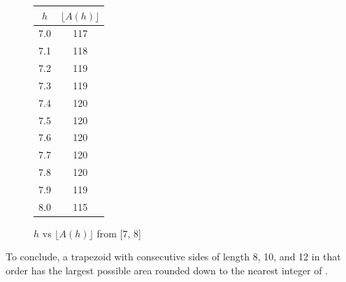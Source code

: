 \begin{solution}
\begin{figure}[h]
    \centering
    \begin{minipage}[h]{0.48\textwidth}
        \vspace{0pt}
        \caption{Graph of both normal and floor functions. \\ $A(h) = \frac{10+\left(\sqrt{64-h^{2}}+10+\sqrt{144-h^{2}}\right)}{2}h, \quad 0 < h \leq 8$}
    \end{minipage}
    \hfill
    \begin{minipage}[h]{0.48\textwidth}
        \vspace{0pt}
        \centering
        \begin{tabular}{|c|c|}
        \hline
            $h$ & $\lfloor A(h) \rfloor$ \\ \hline
            7.0 & 117 \\ \hline
            7.1 & 118 \\ \hline
            7.2 & 119 \\ \hline
            7.3 & 119 \\ \hline
            7.4 & 120 \\ \hline
            7.5 & 120 \\ \hline
            7.6 & 120 \\ \hline
            7.7 & 120 \\ \hline
            7.8 & 120 \\ \hline
            7.9 & 119 \\ \hline
            8.0 & 115 \\ \hline
        \end{tabular}
        \caption{$h$ vs $\lfloor A(h) \rfloor$ from [7, 8]}
    \end{minipage}
\end{figure}

To conclude, a trapezoid with consecutive sides of length 8, 10, and 12 in that order has 
the largest possible area rounded down to the nearest integer of . 

\end{solution}